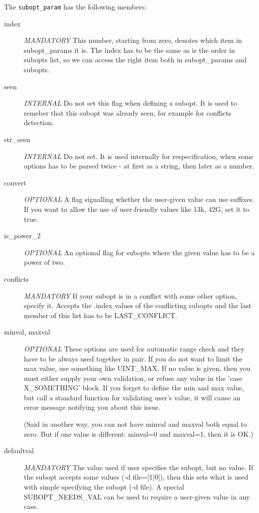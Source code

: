 The {\tt subopt\_param} has the following members:
\begin{description}
\item[index] {\em MANDATORY}
    This number, starting from zero, denotes which item in subopt\_params
    it is. The index has to be the same as is the order in subopts list,
    so we can access the right item both in subopt\_params and subopts.

\item[seen] {\em INTERNAL}
    Do not set this flag when defining a subopt. It is used to remeber that
    this subopt was already seen, for example for conflicts detection.

\item[str\_seen] {\em INTERNAL}
    Do not set. It is used internally for respecification, when some options
    has to be parsed twice - at first as a string, then later as a number.

\item[convert] {\em OPTIONAL}
    A flag signalling whether the user-given value can use suffixes.
    If you want to allow the use of user-friendly values like 13k, 42G,
    set it to true.

\item[is\_power\_2] {\em OPTIONAL}
    An optional flag for subopts where the given value has to be a power
    of two.

\item[conflicts] {\em MANDATORY}
    If your subopt is in a conflict with some other option, specify it.
    Accepts the .index values of the conflicting subopts and the last
    member of this list has to be LAST\_CONFLICT.

\item[minval, maxval] {\em OPTIONAL}
    These options are used for automatic range check and they have to be
    always used together in pair. If you do not want to limit the max value,
    use something like UINT\_MAX. If no value is given, then you must either
    supply your own validation, or refuse any value in the 'case
    X\_SOMETHING' block. If you forget to define the min and max value, but
    call a standard function for validating user's value, it will cause an
    error message notifying you about this issue.

    (Said in another way, you can not have minval and maxval both equal
    to zero. But if one value is different: minval=0 and maxval=1,
    then it is OK.)

\item[defaultval] {\em MANDATORY}
    The value used if user specifies the subopt, but no value.
    If the subopt accepts some values (-d file=[1|0]), then this
    sets what is used with simple specifying the subopt (-d file).
    A special SUBOPT\_NEEDS\_VAL can be used to require a user-given
    value in any case.
		
\end{description}

